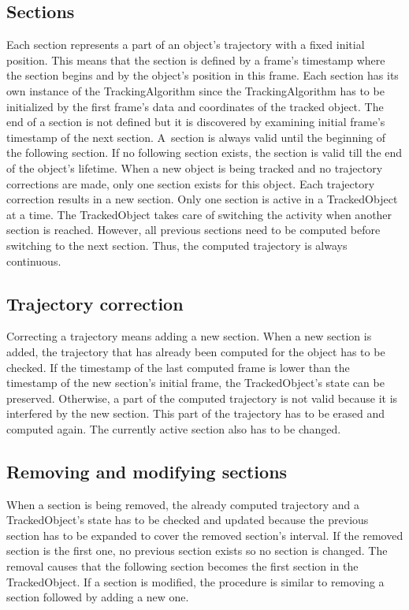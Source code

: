 \subsection{Sections}\label{subs:sections}
Each section represents a part of an object's trajectory with a fixed initial position. This means that the section is defined by a frame's timestamp where the section begins and by the object's position in this frame. Each section has its own instance of the TrackingAlgorithm since the TrackingAlgorithm has to be initialized by the first frame's data and coordinates of the tracked object. The end of a section is not defined but it is discovered by examining initial frame's timestamp of the next section. A~section is always valid until the beginning of the following section. If no following section exists, the section is valid till the end of the object's lifetime. When a new object is being tracked and no trajectory corrections are made, only one section exists for this object. Each trajectory correction results in a new section. Only one section is active in a TrackedObject at a time. The TrackedObject takes care of switching the activity when another section is reached. However, all previous sections need to be computed before switching to the next section. Thus, the computed trajectory is always continuous.

\subsection{Trajectory correction}
Correcting a trajectory means adding a new section. When a new section is added, the trajectory that has already been computed for the object has to be checked. If the timestamp of the last computed frame is lower than the timestamp of the new section's initial frame, the TrackedObject's state can be preserved. Otherwise, a part of the computed trajectory is not valid because it is interfered by the new section. This part of the trajectory has to be erased and computed again. The currently active section also has to be changed.

\subsection{Removing and modifying sections}
When a section is being removed, the already computed trajectory and a TrackedObject's state has to be checked and updated because the previous section has to be expanded to cover the removed section's interval. If the removed section is the first one, no previous section exists so no section is changed. The removal causes that the following section becomes the first section in the TrackedObject. If a section is modified, the procedure is similar to removing a section followed by adding a new one.

